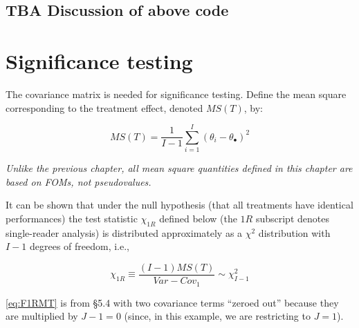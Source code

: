 \documentclass[
]{book}
\newenvironment{Shaded}{\begin{snugshade}}{\end{snugshade}}
\newcommand{\CommentTok}[1]{\textcolor[rgb]{0.56,0.35,0.01}{\textit{#1}}}
\newcommand{\KeywordTok}[1]{\textcolor[rgb]{0.13,0.29,0.53}{\textbf{#1}}}
\newcommand{\NormalTok}[1]{#1}
\newcommand{\OperatorTok}[1]{\textcolor[rgb]{0.81,0.36,0.00}{\textbf{#1}}}
\newcommand{\StringTok}[1]{\textcolor[rgb]{0.31,0.60,0.02}{#1}}
\begin{document}
\begin{Shaded}
\end{Shaded}

\hypertarget{tba-discussion-of-above-code}{%
\subsection{TBA Discussion of above code}\label{tba-discussion-of-above-code}}

\hypertarget{significance-testing}{%
\section{Significance testing}\label{significance-testing}}

The covariance matrix is needed for significance testing. Define the mean square corresponding to the treatment effect, denoted \(MS(T)\), by:

\begin{equation}
MS(T)=\frac{1}{I-1}\sum_{i=1}^{I}(\theta_i-\theta_\bullet)^2
\label{eq:DefinitionMST}
\end{equation}

\emph{Unlike the previous chapter, all mean square quantities defined in this chapter are based on FOMs, not pseudovalues.}

It can be shown that under the null hypothesis (that all treatments have identical performances) the test statistic \(\chi_{1R}\) defined below (the \(1R\) subscript denotes single-reader analysis) is distributed approximately as a \(\chi^2\) distribution with \(I-1\) degrees of freedom, i.e.,

\begin{equation}
\chi_{1R} \equiv \frac{(I-1)MS(T)}{Var-Cov_1} \sim \chi_{I-1}^{2}
\label{eq:F1RMT}
\end{equation}

\eqref{eq:F1RMT} is from §5.4 \citep{RN1865} with two covariance terms ``zeroed out'' because they are multiplied by \(J-1 = 0\) (since, in this example, we are restricting to \(J=1\)).
\end{document}
